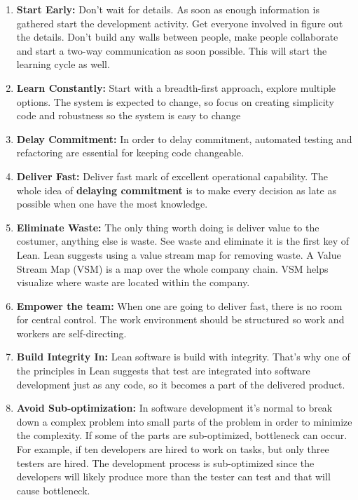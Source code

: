\documentclass[UKenglish]{ifimaster}  %
\begin{document}
\begin{enumerate}
\item \textbf{Start Early:}  Don't wait for details. As soon as enough information is gathered start the development activity. Get everyone involved in figure out the details. Don't build any walls between people, make people collaborate and start a two-way communication as soon possible. This will start the learning cycle as well.

\item \textbf{Learn Constantly:} Start with a breadth-first approach, explore multiple options. The system is expected to change, so focus on creating simplicity code and robustness so the system is easy to change

\item \textbf{Delay Commitment:} 
In order to delay commitment, automated testing and refactoring are essential for keeping code changeable. 

\item \textbf{Deliver Fast:}
Deliver fast mark of excellent operational capability. The whole idea of \textbf{delaying commitment} is to make every decision as late as possible when one have the most knowledge.
\item \textbf{Eliminate Waste:}
The only thing worth doing is deliver value to the costumer, anything else is waste.  See waste and eliminate it is the first key of Lean.  Lean suggests using a value stream map for removing waste. A Value Stream Map (VSM) is a map over the whole company chain. VSM helps visualize where waste are located within the company.
\item \textbf{Empower the team:} When one are going to deliver fast, there is no room for central control. The work environment should be structured so work and workers are self-directing.

\item \textbf{Build Integrity In:} Lean software is build with integrity. That's why one of the principles in Lean suggests that test are integrated into software development just as any code, so it becomes a part of the delivered product. 

\item \textbf{Avoid Sub-optimization:} In software development it's normal to break down a complex problem into small parts of the problem in order to minimize the complexity.  If some of the parts are sub-optimized, bottleneck can occur. For example, if ten developers are hired to work on tasks, but only three testers are hired. The development process is sub-optimized since the developers will likely produce more than the tester can test and that will cause bottleneck.
\end{enumerate}
\end{document}
